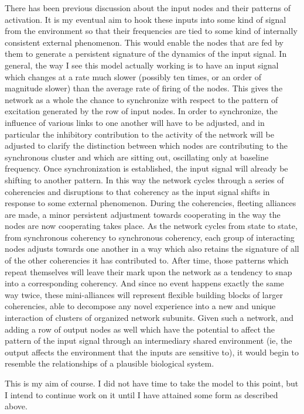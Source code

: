 \documentclass[12pt]{article}
\begin{document}
There has been previous discussion about the input nodes and their patterns of activation.  It is my eventual aim to hook these inputs into some kind of signal from the environment so that their frequencies are tied to some kind of internally consistent external phenomenon.   This would enable the nodes that are fed by them to generate a persistent signature of the dynamics of the input signal.  In general, the way I see this model actually working is to have an input signal which changes at a rate much slower (possibly ten times, or an order of magnitude slower) than the average rate of firing of the nodes.  This gives the network as a whole the chance to synchronize with respect to the pattern of excitation generated by the row of input nodes.  In order to synchronize, the influence of various links to one another will have to be adjusted, and in particular the inhibitory contribution to the activity of the network will be adjusted to clarify the distinction between which nodes are contributing to the synchronous cluster and which are sitting out, oscillating only at baseline frequency.  Once synchronization is established, the input signal will already be shifting to another pattern.  In this way the network cycles through a series of coherencies and disruptions to that coherency as the input signal shifts in response to some external phenomenon.  During the coherencies, fleeting alliances are made, a minor persistent adjustment towards cooperating in the way the nodes are now cooperating takes place.  As the network cycles from state to state, from synchronous coherency to synchronous coherency, each group of interacting nodes adjusts towards one another in a way which also retains the signature of all of the other coherencies it has contributed to.  After time, those patterns which repeat themselves will leave their mark upon the network as a tendency to snap into a corresponding coherency.  And since no event happens exactly the same way twice, these mini-alliances will represent flexible building blocks of larger coherencies, able to decompose any novel experience into a new and unique interaction of clusters of organized network subunits.  Given such a network, and adding a row of output nodes as well which have the potential to affect the pattern of the input signal through an intermediary shared environment (ie, the output affects the environment that the inputs are sensitive to), it would begin to resemble the relationships of a plausible biological system.

This is my aim of course.  I did not have time to take the model to this point, but I intend to continue work on it until I have attained some form as described above.
\end{document}
